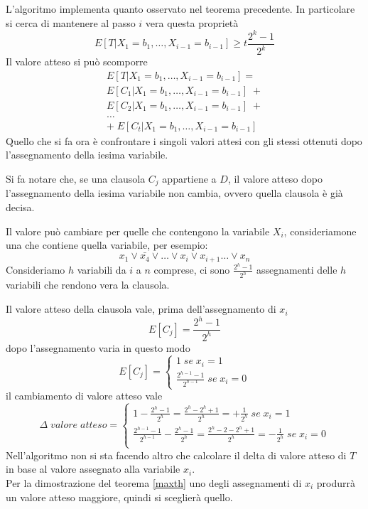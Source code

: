 L'algoritmo implementa quanto osservato nel teorema precedente.
In particolare si cerca di mantenere al passo $i$ vera questa proprietà
$$E[T|X_1 = b_1, \dots, X_{i-1} = b_{i-1}] \geq t\frac{2^k -1}{2^k}$$
Il valore atteso si può scomporre
\begin{equation}
    \begin{aligned}
        E[T|X_1 = b_1, \dots, X_{i-1} = b_{i-1}] = \\
        E[C_1|X_1 = b_1, \dots, X_{i-1} = b_{i-1}]\;+\\
        E[C_2|X_1 = b_1, \dots, X_{i-1} = b_{i-1}]\;+\\
        \dots\\
        + \; E[C_t|X_1 = b_1, \dots, X_{i-1} = b_{i-1}]  
    \end{aligned}
\end{equation}
Quello che si fa ora è confrontare i singoli valori attesi con gli stessi 
ottenuti dopo l'assegnamento della iesima variabile.

Si fa notare che, se una clausola $C_j$ appartiene a $D$, il valore atteso dopo 
l'assegnamento della iesima variabile non cambia, ovvero quella clausola è già decisa.

Il valore può cambiare per quelle che contengono la variabile $X_i$, consideriamone una
che contiene quella variabile, per esempio:
$$x_1 \lor \bar{x_4} \lor \dots \lor x_i \lor x_{i+1} \dots \lor x_n$$
Consideriamo $h$ variabili da $i$ a $n$ comprese, ci sono $\frac{2^h -1}{2^h}$ assegnamenti delle $h$ variabili che rendono vera 
la clausola.

Il valore atteso della clausola vale, prima dell'assegnamento di $x_i$
$$E[C_j] = \frac{2^{h} -1}{2^{h}}$$
dopo l'assegnamento varia in questo modo
\[
    E[C_j] = 
    \begin{cases}
        1\;\mathit{se}\; x_i = 1\\
        \frac{2^{h-1} -1}{2^{h-1}} \;\mathit{se}\; x_i = 0
    \end{cases}
\]
il cambiamento di valore atteso vale 
\[
    \Delta\;\mathit{valore}\;\mathit{atteso} = 
    \begin{cases}
        1 - \frac{2^h -1}{2^h} = \frac{2^h - 2^h + 1}{2^h} = +\frac{1}{2^h}\;\mathit{se}\; x_i = 1\\
        \frac{2^{h-1} -1}{2^{h-1}} - \frac{2^h -1}{2^h} = \frac{2^h -2 - 2^h + 1}{2^h} = -\frac{1}{2^h}\;\mathit{se}\; x_i = 0\\
    \end{cases}
\]
Nell'algoritmo non si sta facendo altro che calcolare il delta di valore atteso di $T$ in base al 
valore assegnato alla variabile $x_i$.\\
Per la dimostrazione del teorema \ref{maxth} uno degli assegnamenti di $x_i$ produrrà un valore atteso 
maggiore, quindi si sceglierà quello.

